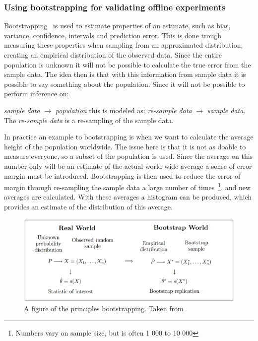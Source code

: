 \subsubsection{Using bootstrapping for validating offline experiments}
Bootstrapping~\cite{efron1994introduction} is used to estimate properties of an
estimate, such as bias, variance, confidence, intervals and prediction error.
This is done trough measuring these properties when sampling from an
approximated distribution, creating an empirical distribution of the observed
data.  Since the entire population is unknown it will not be possible to
calculate the true error from the sample data.  The idea then is that with this
information from sample data it is possible to say something about the
population.  Since it will not be possible to perform inference on:

\emph{sample data} $\rightarrow$ \emph{population} this is modeled as:
\emph{re-sample data} $\rightarrow$ \emph{sample data}.
The \emph{re-sample data} is a re-sampling of the sample data.

In practice an example to bootstrapping is when we want to calculate the
average height of the population worldwide.  The issue here is that it is not
as doable to measure everyone, so a subset of the population is used.  Since
the average on this number only will be an estimate of the actual world wide
average a sense of error margin must be introduced.  Bootstrapping is then used
to reduce the error of margin through re-sampling the sample data a large
number of times~\footnote{Numbers vary on sample size, but is often 1 000 to 10
000}, and new averages are calculated.  With these averages a histogram can be
produced, which provides an estimate of the distribution of this average.

\begin{figure}[H]
    \includegraphics[scale=0.5]{image/bootstrap.png}
    \centering
    \caption[Bootstrapping principles]{A figure of the principles bootstrapping. Taken from~\cite{Eichler2003}}
    \label{figure:bootstrapping}
\end{figure}

